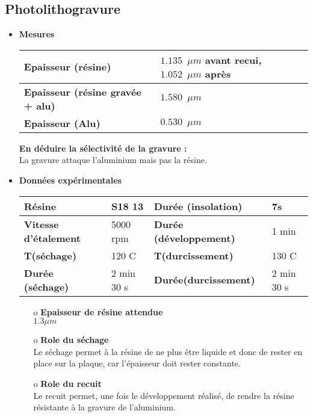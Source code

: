\documentclass[11pt]{article}
\begin{document}
\subsection{Photolithogravure}

\begin{itemize}

\item \textbf{Mesures}

    \noindent \begin{tabular}[!htb]{ | p{7cm} | p{7cm} | }
    \hline
    \textbf{Epaisseur (r\'esine)} & $1.135 \phantom{2}\mu m$ avant recui, $1.052 \phantom{2} \mu m$ apr\`es \\ \hline
    \textbf{Epaisseur (r\'esine grav\'ee + alu)} &  $1.580 \phantom{2} \mu m$\\ \hline
    \textbf{Epaisseur (Alu)} & $0.530 \phantom{2} \mu m$\\
    \hline
    \end{tabular}


\textbf{En d\'eduire la s\'electivit\'e de la gravure :} \\
La gravure attaque l'aluminium mais pas la r\'esine.

\item \textbf{Donn\'ees exp\'erimentales}

    \noindent \begin{tabular}[!htb]{ | p{3.5cm} | p{3.5cm} | p{4cm} | p{3.5cm} | }
    \hline
    \textbf{R\'esine} & S18 13 & \textbf{Dur\'ee (insolation)}  & 7s\\ \hline
    \textbf{Vitesse d'\'etalement} & 5000 rpm & \textbf{Dur\'ee (d\'eveloppement)} & 1 min\\ \hline
    \textbf{T(s\'echage)} & 120 C & \textbf{T(durcissement)} & 130 C\\ \hline
    \textbf{Dur\'ee (s\'echage)} & 2 min 30 s & \textbf{Dur\'ee(durcissement)} & 2 min 30 s \\
    \hline
    \end{tabular}

\begin{itemize}
\item[o] \textbf{Epaisseur de r\'esine attendue} \\
$1.3 \mu m$
\item[o] \textbf{Role du s\'echage}\\
Le s\'echage permet \`a la r\'esine de ne plus \^etre liquide et donc de rester en place sur la plaque, car l'\'epaisseur doit rester constante.
\item[o] \textbf{Role du recuit}\\
Le recuit permet, une fois le d\'eveloppement r\'ealis\'e, de rendre la r\'esine r\'esistante \`a la gravure de l'aluminium.


\end{itemize}
\end{itemize}
\end{document}
